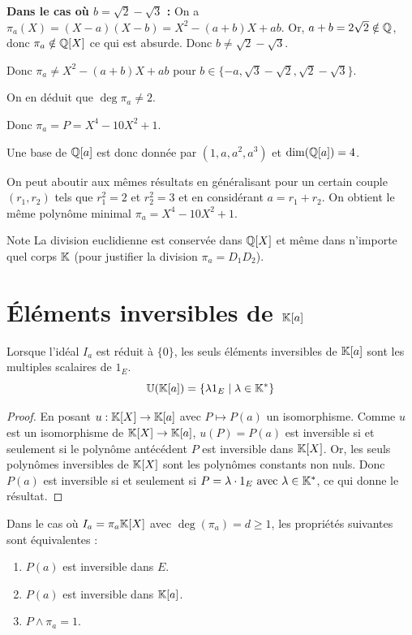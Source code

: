\documentclass[11pt,a4paper]{report}
\begin{document}
\begin{correction}
    \textbf{Dans le cas où $b = \sqrt 2 - \sqrt 3$ :}
    On a $\pi_a(X) = (X-a)(X-b) = X^2 - (a+b)X + ab$. Or, $a+b = 2\sqrt 2 \notin \mathbb{Q}$, donc $\pi_a \notin \mathbb{Q}[X]$ ce qui est absurde. Donc $b \ne \sqrt 2 - \sqrt 3$.

    Donc $\pi_a \ne X^2 - (a+b)X + ab$ pour $b \in \{-a, \sqrt 3 - \sqrt 2, \sqrt 2 - \sqrt 3\}$.

    On en déduit que $\deg \pi_a \ne 2$.

    Donc $\pi_a = P = X^4 - 10X^2 + 1$.

    Une base de $\mathbb{Q}[a]$ est donc donnée par $(1, a, a^2, a^3)$ et $\dim(\mathbb{Q}[a]) = 4$.

    On peut aboutir aux mêmes résultats en généralisant pour un certain couple $(r_1,r_2)$ tels que $r_1^2 = 2$ et $r_2^2 = 3$ et en considérant $a = r_1 + r_2$. On obtient le même polynôme minimal $\pi_a = X^4 - 10X^2 + 1$.
\end{correction}

\begin{customenv}{}{Note}
    La division euclidienne est conservée dans $\mathbb{Q}[X]$ et même dans n'importe quel corps $\mathbb{K}$ (pour justifier la division $\pi_a = D_1D_2$).
\end{customenv}

\chapter{Éléments inversibles de $\mathbb{K}[a]$}

\begin{property}
    Lorsque l'idéal $I_a$ est réduit à $\{0\}$, les seuls éléments inversibles de $\mathbb{K}[a]$ sont les multiples scalaires de $1_E$.
    $$\mathbb{U}(\mathbb{K}[a]) = \{\lambda 1_E \mid \lambda \in \mathbb{K}^*\}$$
\end{property}

\begin{proof}
    En posant $u : \mathbb{K}[X] \to \mathbb{K}[a]$ avec $P \mapsto P(a)$ un isomorphisme. Comme $u$ est un isomorphisme de $\mathbb{K}[X] \to \mathbb{K}[a]$, $u(P) = P(a)$ est inversible si et seulement si le polynôme antécédent $P$ est inversible dans $\mathbb{K}[X]$. Or, les seuls polynômes inversibles de $\mathbb{K}[X]$ sont les polynômes constants non nuls. Donc $P(a)$ est inversible si et seulement si $P = \lambda \cdot 1_E \text{ avec } \lambda \in \mathbb{K}^*$, ce qui donne le résultat.
\end{proof}

\begin{property}
    Dans le cas où $I_a = \pi_a \mathbb{K}[X]$ avec $\deg(\pi_a) = d \ge 1$, les propriétés suivantes sont équivalentes :
    \begin{enumerate}
        \item $P(a)$ est inversible dans $E$.
        \item $P(a)$ est inversible dans $\mathbb{K}[a]$.
        \item $P \wedge \pi_a = 1$.
    \end{enumerate}
\end{property}
\end{document}
